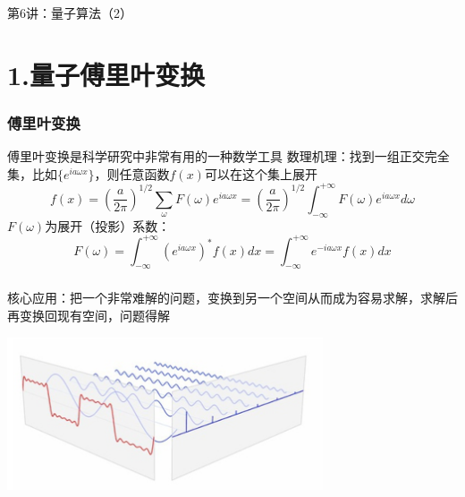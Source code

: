

\begin{frame} [plain]
    \frametitle{}
    \Background[1] 
    \begin{center}
    {\huge 第6讲：量子算法（2）    }
    \end{center}  
    \addtocounter{framenumber}{-1}   
\end{frame}

\section{1.量子傅里叶变换}

\begin{frame}
    \frametitle{傅里叶变换}
    \begin{itemize}
        \Item 傅里叶变换是科学研究中非常有用的一种数学工具
        \Item 数理机理：找到一组正交完全集，比如$\{e^{ia\omega x}\}$，则任意函数$f(x)$可以在这个集上展开
        \[ f(x)=(\frac{a}{2\pi})^{1/2}\sum_\omega F(\omega) e^{ia\omega x} = (\frac{a}{2\pi}) ^{1/2}\int_{-\infty}^{+\infty} F(\omega) e^{ia\omega x} d\omega\]
        $F(\omega)$为展开（投影）系数：
        \[F(\omega)=\int_{-\infty}^{+\infty}  (e^{ia\omega x}) ^* f(x) dx = \int_{-\infty}^{+\infty}  e^{-ia\omega x} f(x) dx \]
    \end{itemize}
\end{frame}

\begin{frame}
    \frametitle{}
    \begin{itemize}
        \Item 核心应用：把一个非常难解的问题，变换到另一个空间从而成为容易求解，求解后再变换回现有空间，问题得解\\
    \end{itemize}
    \begin{center}
        \includegraphics[width=0.7\textwidth]{figs/36.png}
    \end{center}
\end{frame}

